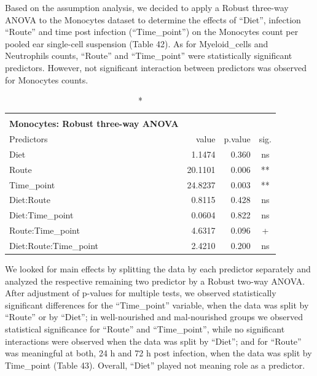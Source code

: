 \documentclass[
  12pt,
  letterpaper,
]{article}
\begin{document}
Based on the assumption analysis, we decided to apply a Robust three-way ANOVA to the Monocytes dataset to determine the effects of ``Diet'', infection ``Route'' and time post infection (``Time\_point'') on the Monocytes count per pooled ear single-cell suspension (Table 42). As for Myeloid\_cells and Neutrophils counts, ``Route'' and ``Time\_point'' were statistically significant predictors. However, not significant interaction between predictors was observed for Monocytes counts.

\begin{longtable}{l|rrc}
\caption*{
{\large \textbf{Appendix Table 42}} \\ 
{\small \textbf{Monocytes: Robust three-way ANOVA}}
} \\ 
\toprule
\multicolumn{1}{l}{Predictors} & value & p.value & sig. \\ 
\midrule\addlinespace[2.5pt]
Diet & 1.1474 & 0.360 & ns \\ 
Route & 20.1101 & 0.006 & ** \\ 
Time\_point & 24.8237 & 0.003 & ** \\ 
Diet:Route & 0.8115 & 0.428 & ns \\ 
Diet:Time\_point & 0.0604 & 0.822 & ns \\ 
Route:Time\_point & 4.6317 & 0.096 & + \\ 
Diet:Route:Time\_point & 2.4210 & 0.200 & ns \\ 
\bottomrule
\end{longtable}

We looked for main effects by splitting the data by each predictor separately and analyzed the respective remaining two predictor by a Robust two-way ANOVA. After adjustment of p-values for multiple tests, we observed statistically significant differences for the ``Time\_point'' variable, when the data was split by ``Route'' or by ``Diet''; in well-nourished and mal-nourished groups we observed statistical significance for ``Route'' and ``Time\_point'', while no significant interactions were observed when the data was split by ``Diet''; and for ``Route'' was meaningful at both, 24 h and 72 h post infection, when the data was split by Time\_point (Table 43). Overall, ``Diet'' played not meaning role as a predictor.
\end{document}
